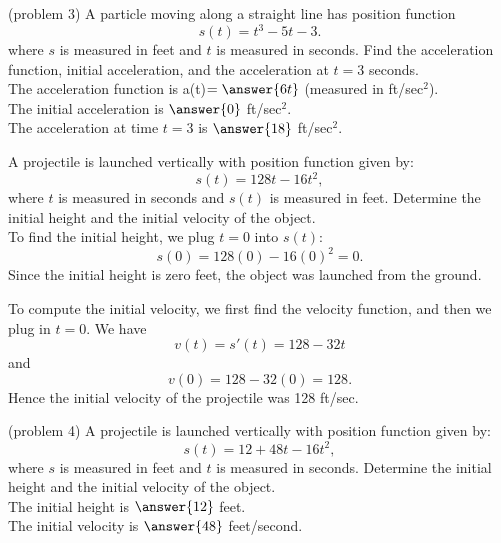 \documentclass[handout]{ximera}
\begin{document}
\begin{problem}(problem 3)
A particle moving along a straight line has position function
\[s(t) = t^3 - 5t -3.\]
where $s$ is measured in feet and $t$ is measured in seconds.
Find the acceleration function, initial acceleration, and the acceleration at $t = 3$ seconds.\\

The acceleration function is a(t)$ = \answer{6t}$ (measured in ft/sec$^2$).\\
The initial acceleration is $\answer{0}$ ft/sec$^2$.\\
The acceleration at time $t=3$ is $\answer{18}$ ft/sec$^2$.


\end{problem}



\begin{example}[example 4]
A projectile is launched vertically with position function given by:
\[s(t) = 128t - 16t^2,\]
where $t$ is measured in seconds and $s(t)$ is measured in feet.
Determine the initial height and the initial velocity of the object.\\

To find the initial height, we plug $t = 0$ into $s(t)$:
\[s(0) = 128(0) - 16(0)^2 = 0.\]
Since the initial height is zero feet, the object was launched from the ground.

To compute the initial velocity, we first find the velocity function, and then we plug in $t=0$.
We have
\[v(t) = s'(t) = 128 - 32t\]
and 
\[v(0) = 128 - 32(0) = 128.\]
Hence the initial velocity of the projectile was 128 ft/sec.

\end{example}


\begin{problem} (problem 4)
A projectile is launched vertically with position function given by:
\[s(t) = 12 + 48t - 16t^2,\]
where $s$ is measured in feet and $t$ is measured in seconds.
Determine the initial height and the initial velocity of the object.\\

The initial height is $\answer{12}$ feet.\\
The initial velocity is $\answer{48}$ feet/second.

\end{problem}
\end{document}
